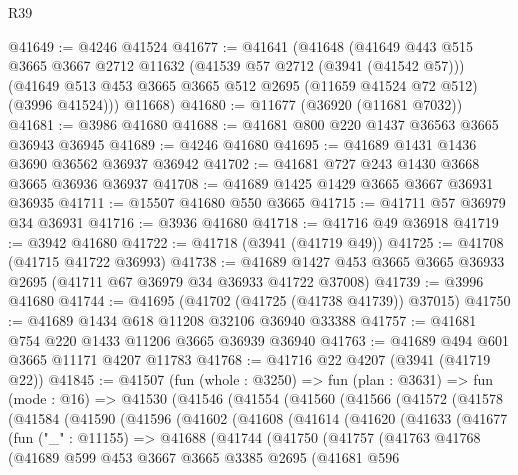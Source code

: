 \begin{lexlean}{R39}
\begin{coremodule}
@41649 := @4246 @41524
@41677 := @41641
    (@41648
      (@41649
        @443
        @515
        @3665
        @3667
        @2712
        @11632
        (@41539 @57 @2712 (@3941 (@41542 @57)))
        (@41649 @513 @453 @3665 @3665 @512 @2695 (@11659 @41524 @72 @512) (@3996 @41524)))
      @11668)
@41680 := @11677 (@36920 (@11681 @7032))
@41681 := @3986 @41680
@41688 := @41681 @800 @220 @1437 @36563 @3665 @36943 @36945
@41689 := @4246 @41680
@41695 := @41689 @1431 @1436 @3690 @36562 @36937 @36942
@41702 := @41681 @727 @243 @1430 @3668 @3665 @36936 @36937
@41708 := @41689 @1425 @1429 @3665 @3667 @36931 @36935
@41711 := @15507 @41680 @550 @3665
@41715 := @41711 @57 @36979 @34 @36931
@41716 := @3936 @41680
@41718 := @41716 @49 @36918
@41719 := @3942 @41680
@41722 := @41718 (@3941 (@41719 @49))
@41725 := @41708 (@41715 @41722 @36993)
@41738 := @41689 @1427 @453 @3665 @3665 @36933 @2695 (@41711 @67 @36979 @34 @36933 @41722 @37008)
@41739 := @3996 @41680
@41744 := @41695 (@41702 (@41725 (@41738 @41739)) @37015)
@41750 := @41689 @1434 @618 @11208 @32106 @36940 @33388
@41757 := @41681 @754 @220 @1433 @11206 @3665 @36939 @36940
@41763 := @41689 @494 @601 @3665 @11171 @4207 @11783
@41768 := @41716 @22 @4207 (@3941 (@41719 @22))
@41845 := @41507
    (fun (whole : @3250) =>
    fun (plan : @3631) =>
    fun (mode : @16) =>
    @41530
      (@41546
        (@41554
          (@41560
            (@41566
              (@41572
                (@41578
                  (@41584
                    (@41590
                      (@41596
                        (@41602
                          (@41608
                            (@41614
                              (@41620
                                (@41633
                                  (@41677
                                    (fun ("_" : @11155) =>
                                    @41688
                                      (@41744
                                        (@41750
                                          (@41757
                                            (@41763
                                              @41768
                                              (@41689
                                                @599
                                                @453
                                                @3667
                                                @3665
                                                @3385
                                                @2695
                                                (@41681
                                                  @596

\end{coremodule}
\end{lexlean}
